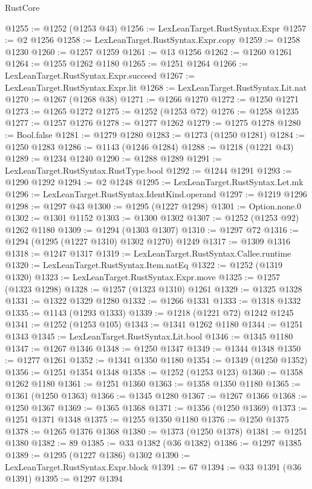 \begin{lexlean}{RustCore}
\begin{coremodule}
@1255 := @1252 (@1253 @43)
@1256 := LexLeanTarget.RustSyntax.Expr
@1257 := @2 @1256
@1258 := LexLeanTarget.RustSyntax.Expr.copy
@1259 := @1258 @1230
@1260 := @1257 @1259
@1261 := @13 @1256
@1262 := @1260 @1261
@1264 := @1255 @1262 @1180
@1265 := @1251 @1264
@1266 := LexLeanTarget.RustSyntax.Expr.succeed
@1267 := LexLeanTarget.RustSyntax.Expr.lit
@1268 := LexLeanTarget.RustSyntax.Lit.nat
@1270 := @1267 (@1268 @38)
@1271 := @1266 @1270
@1272 := @1250 @1271
@1273 := @1265 @1272
@1275 := @1252 (@1253 @72)
@1276 := @1258 @1235
@1277 := @1257 @1276
@1278 := @1277 @1262
@1279 := @1275 @1278
@1280 := Bool.false
@1281 := @1279 @1280
@1283 := @1273 (@1250 @1281)
@1284 := @1250 @1283
@1286 := @1143 (@1246 @1284)
@1288 := @1218 (@1221 @43)
@1289 := @1234 @1240
@1290 := @1288 @1289
@1291 := LexLeanTarget.RustSyntax.RustType.bool
@1292 := @1244 @1291
@1293 := @1290 @1292
@1294 := @2 @1248
@1295 := LexLeanTarget.RustSyntax.Let.mk
@1296 := LexLeanTarget.RustSyntax.IdentKind.operand
@1297 := @1219 @1296
@1298 := @1297 @43
@1300 := @1295 (@1227 @1298)
@1301 := Option.none.{0}
@1302 := @1301 @1152
@1303 := @1300 @1302
@1307 := @1252 (@1253 @92) @1262 @1180
@1309 := @1294 (@1303 @1307)
@1310 := @1297 @72
@1316 := @1294 (@1295 (@1227 @1310) @1302 @1270) @1249
@1317 := @1309 @1316
@1318 := @1247 @1317
@1319 := LexLeanTarget.RustSyntax.Callee.runtime
@1320 := LexLeanTarget.RustSyntax.Item.natEq
@1322 := @1252 (@1319 @1320)
@1323 := LexLeanTarget.RustSyntax.Expr.move
@1325 := @1257 (@1323 @1298)
@1328 := @1257 (@1323 @1310) @1261
@1329 := @1325 @1328
@1331 := @1322 @1329 @1280
@1332 := @1266 @1331
@1333 := @1318 @1332
@1335 := @1143 (@1293 @1333)
@1339 := @1218 (@1221 @72) @1242 @1245
@1341 := @1252 (@1253 @105)
@1343 := @1341 @1262 @1180
@1344 := @1251 @1343
@1345 := LexLeanTarget.RustSyntax.Lit.bool
@1346 := @1345 @1180
@1347 := @1267 @1346
@1348 := @1250 @1347
@1349 := @1344 @1348
@1350 := @1277 @1261
@1352 := @1341 @1350 @1180
@1354 := @1349 (@1250 @1352)
@1356 := @1251 @1354 @1348
@1358 := @1252 (@1253 @123)
@1360 := @1358 @1262 @1180
@1361 := @1251 @1360
@1363 := @1358 @1350 @1180
@1365 := @1361 (@1250 @1363)
@1366 := @1345 @1280
@1367 := @1267 @1366
@1368 := @1250 @1367
@1369 := @1365 @1368
@1371 := @1356 (@1250 @1369)
@1373 := @1251 @1371 @1348
@1375 := @1255 @1350 @1180
@1376 := @1250 @1375
@1378 := @1265 @1376 @1368
@1380 := @1373 (@1250 @1378)
@1381 := @1251 @1380
@1382 := 89
@1385 := @33 @1382 (@36 @1382)
@1386 := @1297 @1385
@1389 := @1295 (@1227 @1386) @1302
@1390 := LexLeanTarget.RustSyntax.Expr.block
@1391 := 67
@1394 := @33 @1391 (@36 @1391)
@1395 := @1297 @1394

\end{coremodule}
\end{lexlean}
